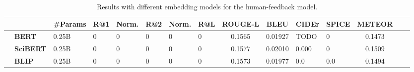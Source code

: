 \begin{table}%
\centering
\renewcommand{\arraystretch}{1.1} 
\setlength{\tabcolsep}{6.9pt} 
\small
\begin{tabularx}{0.6\linewidth}{l l H HH HH Hc cH Hccc}
\toprule
&
& 
\textbf{\#Params} & 
R@1 & \sc Norm. & %
R@2 & \sc Norm. & %
R@L & 
\textbf{ROUGE-L} &
\textbf{BLEU} & 
\textbf{CIDEr} & 
\textbf{SPICE} &
\textbf{METEOR} &
\\ \midrule

& \textbf{BERT} & 0.25B & 0 & 0 & 0 & 0 & 0 & 0.1565 & 0.01927 & TODO &  0 & 0.1473 \\ 
& \textbf{SciBERT} & 0.25B & 0 & 0 & 0 & 0 & 0 &   0.1577 &  0.02010 & 0.000  & 0 & 0.1509 \\ 
& \textbf{BLIP} & 0.25B & 0 & 0 & 0 & 0 & 0 &  0.1573 &  0.01977 & 0.0  & 0.0 & 0.1494 \\

\bottomrule
\end{tabularx}
\caption{%
Results with different embedding models for the human-feedback model.
}
\label{table:results-comparison-diff-embedding-models}
\end{table}

